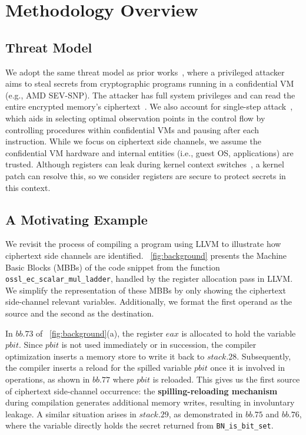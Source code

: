 \section{Methodology Overview}
\label{sec:overview}

\subsection{Threat Model}
\label{subsec:threat}

We adopt the same threat model as prior works~\cite{li2021cipherleaks,li2022systematic}, where a privileged attacker aims to steal secrets from cryptographic programs running in a confidential VM (e.g., AMD SEV-SNP). The attacker has full system privileges and can read the entire encrypted memory's ciphertext~\cite{li2022systematic}. 
We also account for single-step attack~\cite{wilke2023sev}, which aids in selecting optimal observation points in the control flow by controlling procedures within confidential VMs and pausing after each instruction.
While we focus on ciphertext side channels, we assume the confidential VM hardware and internal entities (i.e., guest OS, applications) are trusted. 
Although registers can leak during kernel context switches~\cite{li2022systematic}, a kernel patch can resolve this, so we consider registers are secure to protect secrets in this context.

\subsection{A Motivating Example}
\label{subsec:memorywrite}

We revisit the process of compiling a program using LLVM to illustrate how ciphertext side channels are identified.
\F~\ref{fig:background} presents the Machine Basic Blocks (MBBs) of the code snippet from the function \texttt{ossl\_ec\_scalar\_mul\_ladder}, handled by the register allocation pass in LLVM.
We simplify the representation of these MBBs by only showing the ciphertext side-channel relevant variables. 
Additionally, we format the first operand as the source and the second as the destination.

In $bb.73$ of \F~\ref{fig:background}(a), the register $eax$ is allocated to hold the variable $pbit$. 
Since $pbit$ is not used immediately or in succession, the compiler optimization inserts a memory store to write it back to $stack.28$. 
Subsequently, the compiler inserts a reload for the spilled variable $pbit$ once it is involved in operations, as shown in $bb.77$ where $pbit$ is reloaded.
This gives us the first source of ciphertext side-channel occurrence: the \textbf{spilling-reloading mechanism} during compilation generates additional memory writes, resulting in involuntary leakage.
A similar situation arises in $stack.29$, as demonstrated in $bb.75$ and $bb.76$, where the variable directly holds the secret returned from \texttt{BN\_is\_bit\_set}.

